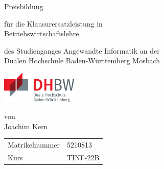 \def\doctype{Dokumententyp}
\def\title{Preisbildung}
\def\author{Joachim Kern}

\begin{titlepage}
\vspace*{\fill}

\begin{center}
	\vspace{5mm}
	
  \huge \title{}
	
	
	
	
	\vspace{42.6pt}
	
	\small für die Klausurersatzleistung in \\
	\large Betriebswirtschaftslehre  	
	\vspace{42.6pt}
	
	\small des Studienganges Angewandte Informatik an der \\
	\large Dualen Hochschule Baden-Württemberg Mosbach
    
    \vspace{14.2pt}
    
    \includegraphics[height=1.5cm]{prefix/image/logo-dhbw}
	
	\vspace{42.6pt}
	
	\small von \\
  \large \author{}\\
  \vspace{50pt}
\end{center}

\vspace{60pt}

\begin{table}[h]
    \centering
    \begin{tabular}{ll}
        \small Matrikelnummer                       & 5210813                       \\
        \small Kurs                 & TINF-22B    \\
    \end{tabular}
\end{table}

\vspace*{\fill}



\end{titlepage}

